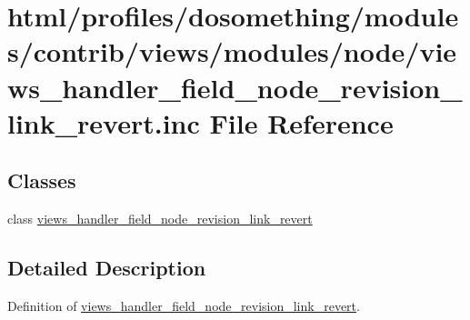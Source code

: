 \hypertarget{views__handler__field__node__revision__link__revert_8inc}{
\section{html/profiles/dosomething/modules/contrib/views/modules/node/views\_\-handler\_\-field\_\-node\_\-revision\_\-link\_\-revert.inc File Reference}
\label{views__handler__field__node__revision__link__revert_8inc}
}
\subsection*{Classes}
\begin{DoxyCompactItemize}
\item 
class \hyperlink{classviews__handler__field__node__revision__link__revert}{views\_\-handler\_\-field\_\-node\_\-revision\_\-link\_\-revert}
\end{DoxyCompactItemize}


\subsection{Detailed Description}
Definition of \hyperlink{classviews__handler__field__node__revision__link__revert}{views\_\-handler\_\-field\_\-node\_\-revision\_\-link\_\-revert}. 